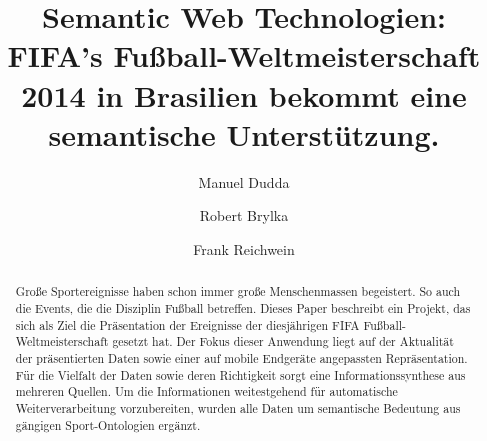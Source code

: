 \documentclass[runningheads,a4paper]{llncs}
\begin{document}
\mainmatter  %

\title{Semantic Web Technologien:\\FIFA's Fu\ss ball-Weltmeisterschaft 2014 in Brasilien bekommt eine semantische Unterst\"utzung.}


%
%
\author{Manuel Dudda \and Robert Brylka\and Frank Reichwein}
%


%
%

\maketitle


\begin{abstract}
Große Sportereignisse haben schon immer große Menschenmassen begeistert. So auch die Events, die die Disziplin Fußball betreffen. Dieses Paper beschreibt ein Projekt, das sich als Ziel die Präsentation der Ereignisse der diesjährigen FIFA Fußball-Weltmeisterschaft gesetzt hat. Der Fokus dieser Anwendung liegt auf der Aktualität der präsentierten Daten sowie einer auf mobile Endgeräte angepassten Repräsentation. Für die Vielfalt der Daten sowie deren Richtigkeit sorgt eine Informationssynthese aus mehreren Quellen. Um die Informationen weitestgehend für automatische Weiterverarbeitung vorzubereiten, wurden alle Daten um semantische Bedeutung aus gängigen Sport-Ontologien ergänzt.
\end{abstract}
\end{document}
